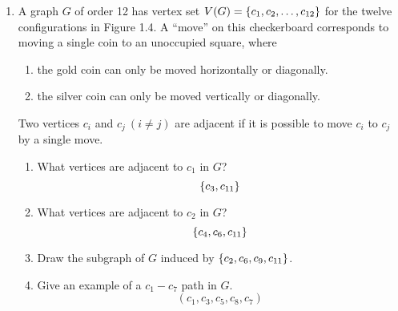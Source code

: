 \documentclass[letterpaper,12pt,fleqn]{article}
\begin{document}
\begin{enumerate}[start=11]
  \bigskip

\item A graph \(G\) of order 12 has vertex set \(V(G)=\{c_1,c_2,\ldots,c_{12}\}\) for the twelve configurations
  in Figure 1.4.  A ``move'' on this checkerboard corresponds to moving a single coin to an unoccupied square,
  where
  \begin{enumerate}[label=(\arabic*)]
  \item the gold coin can only be moved horizontally or diagonally.
  \item the silver coin can only be moved vertically or diagonally.
  \end{enumerate}
  Two vertices \(c_i\) and \(c_j\ (i\ne j)\) are adjacent if it is possible to move \(c_i\) to \(c_j\) by a single move.

  \begin{center}
  \end{center}
  
  \begin{enumerate}
  \item What vertices are adjacent to \(c_1\) in \(G\)?
    \[\{c_3, c_{11}\}\]
  \item What vertices are adjacent to \(c_2\) in \(G\)?
    \[\{c_4, c_6, c_{11}\}\]
  \item Draw the subgraph of \(G\) induced by \(\{c_2,c_6,c_9,c_{11}\}\).
    \begin{center}
    \end{center}
  \item Give an example of a \(c_1-c_7\) path in \(G\).
    \[(c_1, c_3, c_5, c_8, c_7)\]
  \end{enumerate}


\end{enumerate}
\end{document}
